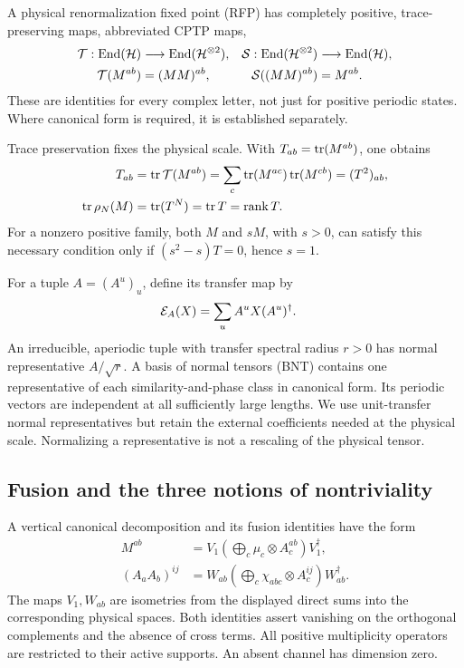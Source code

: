 A physical renormalization fixed point (RFP) has completely positive,
trace-preserving maps, abbreviated CPTP maps,
\begin{align}
	\mathcal{T}:\operatorname{End}(\mathcal{H})            & \longrightarrow\operatorname{End}(\mathcal{H}^{\otimes2}), &
	\mathcal{S}:\operatorname{End}(\mathcal{H}^{\otimes2}) & \longrightarrow\operatorname{End}(\mathcal{H}),
	\nonumber                                                               \\
	\mathcal{T}(M^{ab})                & =(MM)^{ab},                            &
	\mathcal{S}((MM)^{ab})             & =M^{ab}.
	\label{eq:rfp}
\end{align}
These are identities for every complex letter, not just for positive
periodic states. Where canonical form is required, it is established
separately.

Trace preservation fixes the physical scale. With
$T_{ab}=\operatorname{tr}(M^{ab})$, one obtains
\begin{align}
	T_{ab}
	 & =\operatorname{tr}\mathcal{T}(M^{ab})
	=\sum_c\operatorname{tr}(M^{ac})\operatorname{tr}(M^{cb})
	=(T^2)_{ab},                \\
	\operatorname{tr}\rho_N(M)
	 & =\operatorname{tr}(T^N)=\operatorname{tr} T=\operatorname{rank} T.
	\label{eq:physical-scale}
\end{align}
For a nonzero positive family, both $M$ and $sM$, with $s>0$, can
satisfy this necessary condition only if
$(s^2-s)T=0$, hence $s=1$.

For a tuple $A=(A^u)_u$, define its transfer map by
\begin{align}
	\mathcal{E}_A(X) & =\sum_uA^uX(A^u)^\dagger.
\end{align}
An irreducible, aperiodic tuple with transfer spectral radius $r>0$
has normal representative $A/\sqrt r$. A basis of normal tensors
(BNT) contains one representative of each similarity-and-phase class
in canonical form. Its periodic vectors are independent at all
sufficiently large lengths. We use unit-transfer normal representatives
but retain the external coefficients needed at the physical scale.
Normalizing a representative is not a rescaling of the physical
tensor.

\subsection{Fusion and the three notions of nontriviality}

A vertical canonical decomposition and its fusion identities have the
form
\begin{align}
	M^{ab}
	 & =V_1\left(\bigoplus_c\mu_c\otimes A_c^{ab}\right)V_1^\dagger,
	\label{eq:vcf}                                                   \\
	(A_aA_b)^{ij}
	 & =W_{ab}\left(\bigoplus_c\chi_{abc}\otimes A_c^{ij}\right)
	W_{ab}^\dagger.
	\label{eq:fusion}
\end{align}
The maps $V_1,W_{ab}$ are isometries from the displayed direct sums
into the corresponding physical spaces. Both identities assert
vanishing on the orthogonal complements and the absence of cross
terms. All positive multiplicity operators are restricted to their
active supports. An absent channel has dimension zero.

